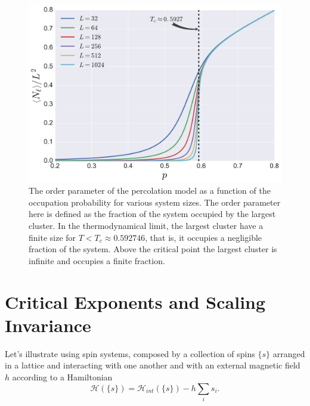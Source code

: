 \begin{figure}
\begin{center}
    \includegraphics[scale=0.4]{chapters/ch2-crit/figs/isoperco2}
\end{center}
\caption{The order parameter of the percolation model as a function of the
    occupation probability for various system sizes. The order parameter here
    is defined as the fraction of the system occupied by the largest cluster.
    In the thermodynamical limit, the largest cluster have a finite size for
    $T<T_c\approx 0.592746$, that is, it occupies a negligible fraction of the
    system. Above the critical point the largest cluster is infinite and occupies
    a finite fraction.}
\label{fig:isoperco2}
\end{figure}



\section{Critical Exponents and Scaling Invariance}
\label{sec:scaling}

Let's illustrate using spin systems, composed by a collection of spins $\{s\}$
arranged in a lattice and interacting with one another and with an
external magnetic field $h$ according to a Hamiltonian
\begin{equation}
    \mathcal{H} \left(\{s\}\right)=
    \mathcal{H}_{int}\left(\{s\}\right) - h\sum_i s_i.
\end{equation}

